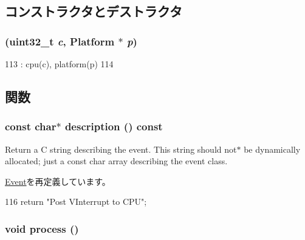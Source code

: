 \subsection{コンストラクタとデストラクタ}
\hypertarget{classVGic_1_1PostVIntEvent_a570dbdb580e7d62ba8a6ffcedad55aac}{
\subsubsection[{PostVIntEvent}]{ ({\bf uint32\_\-t} {\em c}, \/  {\bf Platform} $\ast$ {\em p})}}
\label{classVGic_1_1PostVIntEvent_a570dbdb580e7d62ba8a6ffcedad55aac}



\begin{DoxyCode}
113             : cpu(c), platform(p)
114         { }
\end{DoxyCode}


\subsection{関数}
\hypertarget{classVGic_1_1PostVIntEvent_a2bd90422eece9190794479e08092a252}{
\subsubsection[{description}]{\setlength{\rightskip}{0pt plus 5cm}const char$\ast$ description () const}}
\label{classVGic_1_1PostVIntEvent_a2bd90422eece9190794479e08092a252}
Return a C string describing the event. This string should not$\ast$ be dynamically allocated; just a const char array describing the event class. 

\hyperlink{classEvent_a130ddddf003422b413e2e891b1b80e8f}{Event}を再定義しています。


\begin{DoxyCode}
116 { return "Post VInterrupt to CPU"; }
\end{DoxyCode}
\hypertarget{classVGic_1_1PostVIntEvent_a2e9c5136d19b1a95fc427e0852deab5c}{
\subsubsection[{process}]{\setlength{\rightskip}{0pt plus 5cm}void process ()}}
\label{classVGic_1_1PostVIntEvent_a2e9c5136d19b1a95fc427e0852deab5c}


